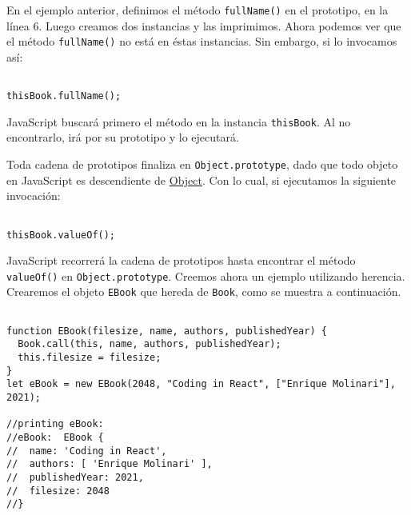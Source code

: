 \documentclass[a4paper, oneside, titlepage, 12pt]{paper}
\begin{document}
En el ejemplo anterior, definimos el método \texttt{fullName()} en el prototipo, en la línea 6. Luego creamos dos instancias y las imprimimos. Ahora podemos ver que el método \texttt{fullName()} no está en éstas instancias. Sin embargo, si lo invocamos así:

\begin{verbatim}

thisBook.fullName();
\end{verbatim}

JavaScript buscará primero el método en la instancia \texttt{thisBook}. Al no encontrarlo, irá por su prototipo y lo ejecutará.
\newline

Toda cadena de prototipos finaliza en \texttt{Object.prototype}, dado que todo objeto en JavaScript es descendiente de \href{https://developer.mozilla.org/es/docs/Web/JavaScript/Reference/Global_Objects/Object}{Object}. Con lo cual, si ejecutamos la siguiente invocación:

\begin{verbatim}

thisBook.valueOf();
\end{verbatim}

JavaScript recorrerá la cadena de prototipos hasta encontrar el método \texttt{valueOf()} en \texttt{Object.prototype}. Creemos ahora un ejemplo utilizando herencia. Crearemos el objeto \texttt{EBook} que hereda de \texttt{Book}, como se muestra a continuación.

\begin{verbatim}

function EBook(filesize, name, authors, publishedYear) {
  Book.call(this, name, authors, publishedYear);
  this.filesize = filesize;
}
let eBook = new EBook(2048, "Coding in React", ["Enrique Molinari"], 2021);

//printing eBook:
//eBook:  EBook {
//  name: 'Coding in React',
//  authors: [ 'Enrique Molinari' ],
//  publishedYear: 2021,
//  filesize: 2048
//}
\end{verbatim}
\end{document}
